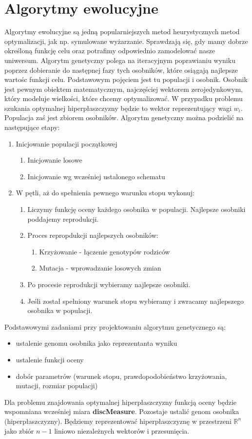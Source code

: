 \documentclass[magisterska]{pracamgr}
\theoremstyle{plain}
\theoremstyle{definition}
\theoremstyle{remark}
\begin{document}
\section{Algorytmy ewolucyjne}
Algorytmy ewolucyjne \cite{Genetic} są jedną popularniejszych metod heurystycznych metod optymalizacji, jak np. symulowane wyżarzanie. Sprawdzają się,
gdy mamy dobrze określoną funkcję celu oraz potrafimy odpowiednio zamodelować nasze uniwersum. Algorytm genetyczny polega na iteracyjnym 
poprawianiu wyniku poprzez dobieranie do następnej fazy tych osobników, które osiągają najlepsze wartośc funkcji celu. Podstawowym
pojęciem jest tu populacji i osobnik. Osobnik jest pewnym obiektem matematycznym, najczęściej wektorem zerojedynkowym, który modeluje
wielkości, które chcemy optymalizować. W przypadku problemu szukania optymalnej hiperpłaszczyzny będzie to wektor reprezentujący wagi $w_i$.
Populacja zaś jest zbiorem osobników. Algorytm genetyczny można podzielić na następujące etapy:
\begin{enumerate}
 \item Inicjowanie populacji początkowej
 \begin{enumerate}
  \item Inicjowanie losowe
  \item Inicjowanie wg wcześniej ustalonego schematu
 \end{enumerate}
 \item W pętli, aż do spełnienia pewnego warunku stopu wykonuj:
 \begin{enumerate}
  \item Liczymy funkcję oceny każdego osobnika w populacji. Najlepsze osobniki poddajemy reprodukcji.
  \item Proces repropdukcji najlepszych osobników:
  \begin{enumerate}
   \item Krzyżowanie - łączenie genotypów rodziców
   \item Mutacja - wprowadzanie losowych zmian
  \end{enumerate}
  \item Po procesie reprodukcji wybieramy najlepsze osobniki.
  \item Jeśli został spełniony warunek stopu wybieramy i zwracamy najlepszego osobnika w populacji.
 \end{enumerate}
\end{enumerate}
Podstawowymi zadaniami przy projektowaniu algorytmu genetycznego są:
\begin{itemize}
 \item ustalenie genomu osobnika jako reprezentanta wyniku
 \item ustalenie funkcji oceny
 \item dobór parametrów (warunek stopu, prawdopodobieństwo krzyżowania, mutacji, rozmiar populacji)
\end{itemize}
Dla problemu znajdowania optymalnej hiperpłaszczyzny funkcją oceny będzie wspomniana wcześniej miara \textbf{discMeasure}.
Pozostaje ustalić genom osobnika (hiperpłaszczyzny). Będziemy reprezentować hiperpłaszczyznę w przestrzeni $\mathbb{R}^n$
jako zbiór $n-1$ liniowo niezależnych wektorów i przesunięcia. 
\end{document}
